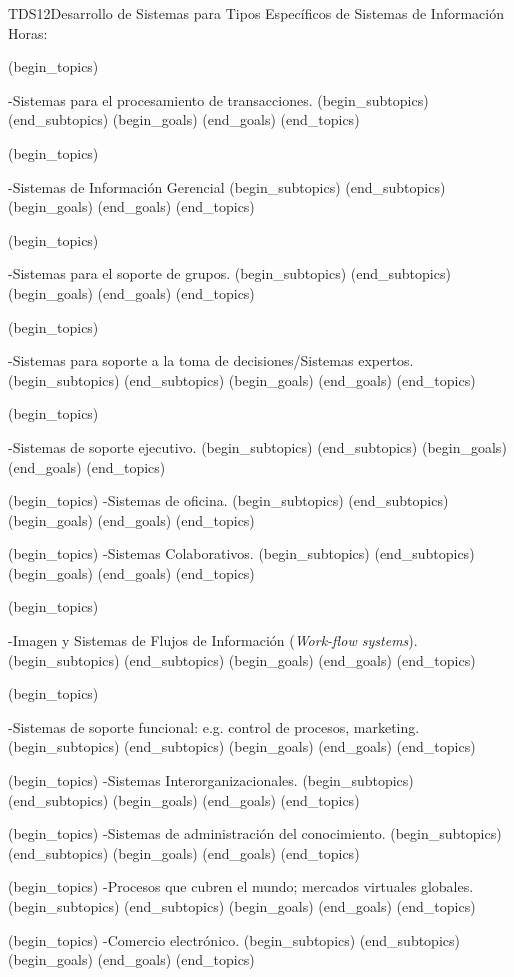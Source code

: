 \begin{BKL2}{TDS12}{Desarrollo de Sistemas para Tipos Específicos de Sistemas de Información}
Horas:
 
(begin_topics)

-Sistemas para el procesamiento de transacciones.
(begin_subtopics)
(end_subtopics)
(begin_goals)
(end_goals)
(end_topics)

 

(begin_topics)

-Sistemas de Información Gerencial
(begin_subtopics)
(end_subtopics)
(begin_goals)
(end_goals)
(end_topics)

 

(begin_topics)

-Sistemas para el soporte de grupos.
(begin_subtopics)
(end_subtopics)
(begin_goals)
(end_goals)
(end_topics)

 

(begin_topics)

-Sistemas para soporte a la toma de decisiones/Sistemas expertos.
(begin_subtopics)
(end_subtopics)
(begin_goals)
(end_goals)
(end_topics)

 

(begin_topics)

-Sistemas de soporte ejecutivo.
(begin_subtopics)
(end_subtopics)
(begin_goals)
(end_goals)
(end_topics)

 

(begin_topics)
-Sistemas de oficina.
(begin_subtopics)
(end_subtopics)
(begin_goals)
(end_goals)
(end_topics)

 

(begin_topics)
-Sistemas Colaborativos.
(begin_subtopics)
(end_subtopics)
(begin_goals)
(end_goals)
(end_topics)

 

(begin_topics)

-Imagen y Sistemas de Flujos de Información ({\it Work-flow systems}).
(begin_subtopics)
(end_subtopics)
(begin_goals)
(end_goals)
(end_topics)

 

(begin_topics)

-Sistemas de soporte funcional: e.g. control de procesos, marketing.
(begin_subtopics)
(end_subtopics)
(begin_goals)
(end_goals)
(end_topics)

 

(begin_topics)
-Sistemas Interorganizacionales.
(begin_subtopics)
(end_subtopics)
(begin_goals)
(end_goals)
(end_topics)

(begin_topics)
-Sistemas de administración del conocimiento.
(begin_subtopics)
(end_subtopics)
(begin_goals)
(end_goals)
(end_topics)

(begin_topics)
-Procesos que cubren el mundo; mercados virtuales globales.
(begin_subtopics)
(end_subtopics)
(begin_goals)
(end_goals)
(end_topics)

(begin_topics)
-Comercio electrónico.
(begin_subtopics)
(end_subtopics)
(begin_goals)
(end_goals)
(end_topics)

\end{BKL2}


